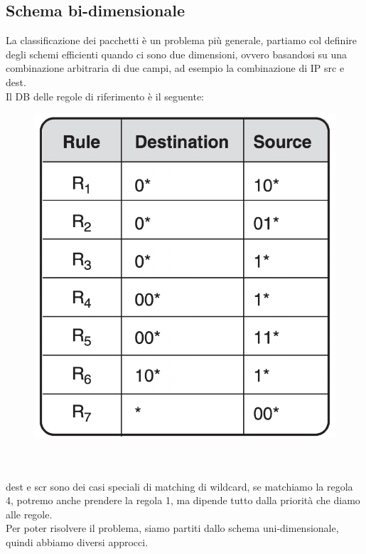 \documentclass[12pt, oneside]{extbook} %
\begin{document}
\subsection{Schema bi-dimensionale}
La classificazione dei pacchetti è un problema più generale, partiamo col definire degli schemi efficienti quando ci sono due dimensioni, ovvero basandosi su una combinazione arbitraria di due campi, ad esempio la combinazione di IP src e dest.
\\Il DB delle regole di riferimento è il seguente:\\
\begin{figure}[h!]
    \centering
    \includegraphics[scale=0.5]{../../immagini/2dim_db}
\end{figure}\\\\
dest e scr sono dei casi speciali di matching di wildcard, se matchiamo la regola 4, potremo anche prendere la regola 1, ma dipende tutto dalla priorità che diamo alle regole.
\\Per poter risolvere il problema, siamo partiti dallo schema uni-dimensionale, quindi abbiamo diversi approcci.
\end{document}
